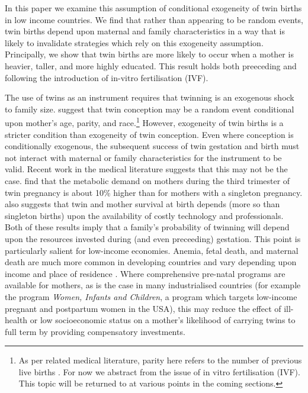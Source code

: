 \documentclass{article}[11pt,subeqn]
\begin{document}
\begin{spacing}{1.5}
In this paper we examine this assumption of conditional exogeneity of twin births in low income countries.  We find that rather than appearing to be random events, 
twin births depend upon maternal and family characteristics in a way that is likely to invalidate strategies which rely on this exogeneity assumption.  Principally, 
we show that twin births are more likely to occur when a mother is heavier, taller, and more highly educated.  This result holds both preeceding and following the introduction
of in-vitro fertilisation (IVF).

The use of twins as an instrument requires that twinning is an exogenous shock to family size.  \citet{Kahnetal2003} suggest that twin conception may 
be a random event conditional upon mother's age, parity, and race.\footnote{As per related medical literature, parity here refers to the number of previous 
live births \citep{Elwood1978}. For now we abstract from the issue of in vitro fertilisation (IVF).  This topic will be returned to at various points in the coming 
sections.}  However, exogeneity of twin births is a stricter condition than exogeneity of twin conception.  Even where conception is conditionally exogenous, 
the subsequent success of twin gestation and birth must not interact with maternal or family characteristics for the instrument to be valid.  Recent work in 
the medical literature suggests that this may not be the case. \citet{Shinagawaetal2005} find that the metabolic demand on mothers during the third trimester 
of twin pregnancy is about 10\% higher than for mothers with a singleton pregnancy. \citet{Philipson2008} also suggests that twin and mother survival at 
birth depends (more so than singleton births) upon the availability of costly technology and professionals.  Both of these results imply that a family's 
probability of twinning will depend upon the resources invested during (and even preceeding) gestation.  This point is particularly salient for low-income 
economies.  Anemia, fetal death, and maternal death are much more common in developing countries and vary depending upon income and place of residence
 \citep{Rush2000}.  Where comprehensive pre-natal programs are available for mothers, as is the case in many industrialised countries (for example the 
program \emph{Women, Infants and Children}, a program which targets low-income pregnant and postpartum women in the USA), this may reduce the effect 
of ill-health or low socioeconomic status on a mother's likelihood of carrying twins to full term by providing compensatory investments.


\end{spacing}
\end{document}
